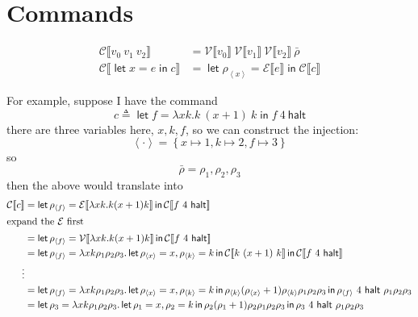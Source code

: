 \documentclass[11pt,a4paper]{article}
\newcommand {\coo} [1] {\ensuremath{\operatorname{\mathsf{#1}}}}
\newcommand{\Let}[1]{\coo{let} #1 \coo{in} }
\newcommand{\Rec}[1]{\left\{#1\right\}}
\newcommand{\ba}[1]{\left\langle #1\right\rangle}
\newcommand{\g}[1]{\textsf{#1}}
\newcommand{\trans}[2]{\ensuremath{\mathcal{#1}\llbracket #2\rrbracket}}
\begin{document}
\section{Commands}
\begin{align*}
\trans{C}{v_0~v_1~v_2} &= \trans{V}{v_0} ~ \trans{V}{v_1} ~ \trans{V}{v_2} ~ \bar\rho \\
\trans{C}{\Let{x = e}{c}} &= \Let{\rho_{\ba{x}} = \trans{E}{e}}{\trans{C}{c}}
\end{align*}

For example, suppose I have the command 
$$
c \triangleq \Let{f = \lambda xk. k~ (x + 1)~k}{f~4~\g{halt}}
$$
there are three variables here, $x,k,f$, so we can construct the injection:
$$
\ba{\cdot} = \Rec{x \mapsto 1, k \mapsto 2, f \mapsto 3}
$$
so
$$
\bar\rho = \rho_1, \rho_2, \rho_3
$$
then the above would translate into
\begin{align*}
\trans{C}{c} &= \Let{\rho_{\ba{f}} = \trans{E}{\lambda xk. k (x + 1)k}}{\trans{C}{f~4~\g{halt}}} \\
\intertext{expand the $\mathcal{E}$ first}
&= \Let{\rho_{\ba{f}} = \trans{V}{\lambda xk. k (x + 1)k}}{\trans{C}{f~4~\g{halt}}} \\
&= \Let{\rho_{\ba{f}} = \lambda xk\rho_1\rho_2\rho_3.\Let{\rho_{\ba{x}} = x,\rho_{\ba{k}} = k}{\trans{C}{k~(x + 1)~k}}}{\trans{C}{f~4~\g{halt}}} \\
\vdots \\
&= \Let{\rho_{\ba{f}} = \lambda xk\rho_1\rho_2\rho_3.\Let{\rho_{\ba{x}} = x,\rho_{\ba{k}} = k}{\rho_{\ba{k}}(\rho_{\ba{x}} + 1)\rho_{\ba{k}}\rho_1\rho_2\rho_3}}{{\rho_{\ba{f}}~4~\g{halt}~\rho_1\rho_2\rho_3}} \\
&=\Let{\rho_{3} = \lambda xk\rho_1\rho_2\rho_3.\Let{\rho_{1} = x,\rho_{2} = k}{\rho_{2}(\rho_{1} + 1)\rho_{2}\rho_1\rho_2\rho_3}}{{\rho_{3}~4~\g{halt}~\rho_1\rho_2\rho_3}}
\end{align*}
\end{document}
